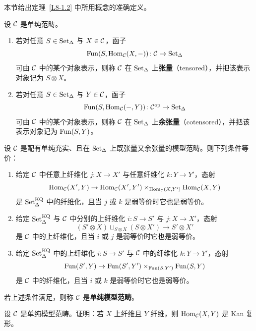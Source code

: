 \nitem\label{L8-2.1} 本节给出定理~\ref{L8-1.2} 中所用概念的准确定义。

\begin{definition}\label{L8-2.2}
设 $\mathcal{C}$ 是单纯范畴。
\begin{enumerate}[label=(\arabic*),leftmargin=2.4em,itemsep=0.2em]
\item 若对任意 $S\in\operatorname{Set}_\Delta$ 与 $X\in\mathcal{C}$，函子
\[
\operatorname{Fun}(S,\operatorname{Hom}_{\mathcal{C}}(X,-))\colon \mathcal{C}\to \operatorname{Set}_\Delta
\]
可由 $\mathcal{C}$ 中的某个对象表示，则称 $\mathcal{C}$ 在 $\operatorname{Set}_\Delta$ 上\textbf{张量}（tensored），并把该表示对象记为 $S\otimes X$。
\item 若对任意 $S\in\operatorname{Set}_\Delta$ 与 $Y\in\mathcal{C}$，函子
\[
\operatorname{Fun}(S,\operatorname{Hom}_{\mathcal{C}}(-,Y))\colon \mathcal{C}^{\mathrm{op}}\to \operatorname{Set}_\Delta
\]
可由 $\mathcal{C}$ 中的某个对象表示，则称 $\mathcal{C}$ 在 $\operatorname{Set}_\Delta$ 上\textbf{余张量}（cotensored），并把该表示对象记为 $\operatorname{Fun}(S,Y)$。
\end{enumerate}
\end{definition}

\begin{theoremdef}[HTT.A.3.1.5, A.3.1.6]\label{L8-2.3}
设 $\mathcal{C}$ 是配有单纯充实、且在 $\operatorname{Set}_\Delta$ 上既张量又余张量的模型范畴。则下列条件等价：
\begin{enumerate}[label=(\roman*),leftmargin=2.8em,itemsep=0.2em]
\item 给定 $\mathcal{C}$ 中任意上纤维化 $j\colon X\to X'$ 与任意纤维化 $k\colon Y\to Y'$，态射
\[
\operatorname{Hom}_{\mathcal{C}}(X',Y)\to \operatorname{Hom}_{\mathcal{C}}(X',Y')\times_{\operatorname{Hom}_{\mathcal{C}}(X,Y')}\operatorname{Hom}_{\mathcal{C}}(X,Y)
\]
是 $\operatorname{Set}^{\mathrm{KQ}}_\Delta$ 中的纤维化，且当 $j$ 或 $k$ 是弱等价时它也是弱等价。
\item 给定 $\operatorname{Set}^{\mathrm{KQ}}_\Delta$ 与 $\mathcal{C}$ 中分别的上纤维化 $i\colon S\to S'$ 与 $j\colon X\to X'$，态射
\[
(S'\otimes X)\sqcup_{S\otimes X}(S\otimes X')\to S'\otimes X'
\]
是 $\mathcal{C}$ 中的上纤维化，且当 $i$ 或 $j$ 是弱等价时它也是弱等价。
\item 给定 $\operatorname{Set}^{\mathrm{KQ}}_\Delta$ 中的上纤维化 $i\colon S\to S'$ 与 $\mathcal{C}$ 中的纤维化 $k\colon Y\to Y'$，态射
\[
\operatorname{Fun}(S',Y)\to \operatorname{Fun}(S',Y')\times_{\operatorname{Fun}(S,Y')}\operatorname{Fun}(S,Y)
\]
是 $\mathcal{C}$ 中的纤维化，且当 $i$ 或 $k$ 是弱等价时它也是弱等价。
\end{enumerate}
若上述条件满足，则称 $\mathcal{C}$ 是\textbf{单纯模型范畴}。
\end{theoremdef}

\begin{exercise}\label{L8-2.4}
设 $\mathcal{C}$ 是单纯模型范畴。证明：若 $X$ 上纤维且 $Y$ 纤维，则 $\operatorname{Hom}_{\mathcal{C}}(X,Y)$ 是 Kan 复形。
\end{exercise}

